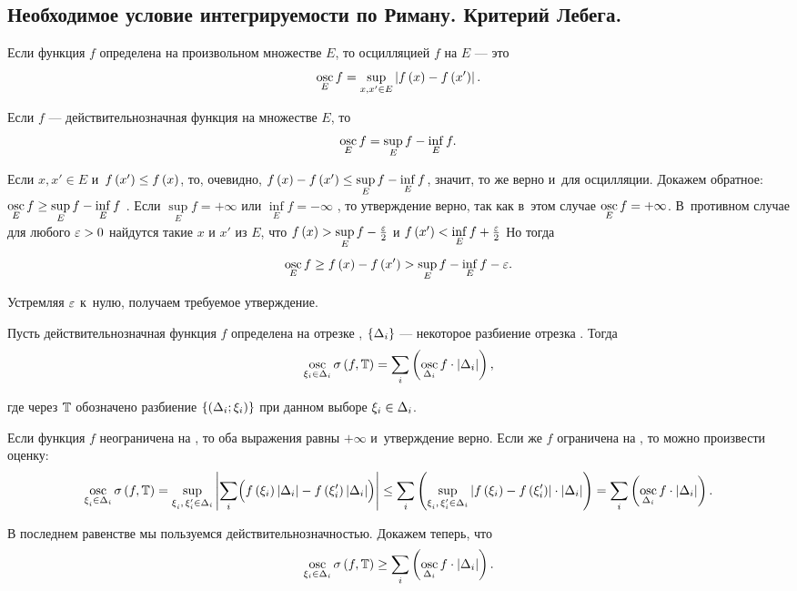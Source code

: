 \documentclass[draft]{article}
\begin{document}
\subsection{Необходимое условие интегрируемости по Риману. Критерий Лебега.}

\df Если функция $f$ определена на произвольном множестве $E$, то
осцилляцией $f$ на $E$ --- это $$\osc_E f=\sup\limits_{x,x'\in E}
\abs{f\atx-f\at(x')}.$$

\bigskip

\ut

Если $f$ --- действительнозначная функция на множестве $E$, то
$$\mathop{\mathrm{osc}}\limits_E f=\sup\limits_E f-\inf\limits_E f.$$

\pr

Если $x,x'\in E$ и~$f\at(x')\le f\atx$, то, очевидно,
$f\atx-f\at(x')\le\sup\limits_E f - \inf\limits_E f$, значит, то же
верно и~для осцилляции. Докажем обратное: $\mathop{\mathrm{osc}}\limits_E f\ge\sup\limits_E
f-\inf\limits_E f$ . Если $\sup\limits_E f=+\infty$
 или $\inf\limits_E f=-\infty$ , то утверждение верно, так как в~этом случае $\mathop{\mathrm{osc}}\limits_E
f=+\infty$. В~противном случае для любого $\varepsilon > 0$ найдутся такие $x$
и $x'$ из $E$, что $f\atx>\sup\limits_E f-{\ep\over2}$ и
$f\at(x')<\inf\limits_E f+{\ep\over2}$ Но тогда
$$\osc_E f\ge f\atx-f\at(x')>\sup\limits_E f-\inf\limits_E f-\ep.$$

Устремляя $\varepsilon$ к~нулю, получаем требуемое утверждение.

\prut

\bigskip

\lm

Пусть действительнозначная функция $f$ определена на отрезке \ab,
$\left\{\Delta_i\right\}$ --- некоторое разбиение отрезка \ab. Тогда
$$\osc_{\xii\in\dei} \isfT=\sumi\at(\osc_{\dei}f\cdot\ldei),$$

где через $\mathbb{T}$ обозначено разбиение $\dixif$ при данном выборе
$\xi_i\in\Delta_i$.

\pr

Если функция $f$ неограничена на \ab, то оба выражения равны
$+\infty$ и~утверждение верно. Если же $f$ ограничена на \ab, то
можно произвести оценку:
$$\osc_{\xii^{}\in\dei} \isfT=    \sup\limits_{\xii^{},\,\xii'\in\dei}
\abs{\sumi\Bigl(
f\at(\xii)\ldei-f\at(\xii')\ldei\Bigr)}\le\sumi\at(\sup\limits_{\xii^{},\,\xii'\in\dei}
\abs{f\at(\xii)-f\at(\xii')}\cdot\ldei)=\sumi\at(\osc_{\dei}f\cdot\ldei).$$

В последнем равенстве мы пользуемся действительнозначностью. Докажем
теперь, что
$$\osc_{\xii\in\dei} \isfT\ge\sumi\at(\osc_{\dei}f\cdot\ldei).$$
\end{document}
